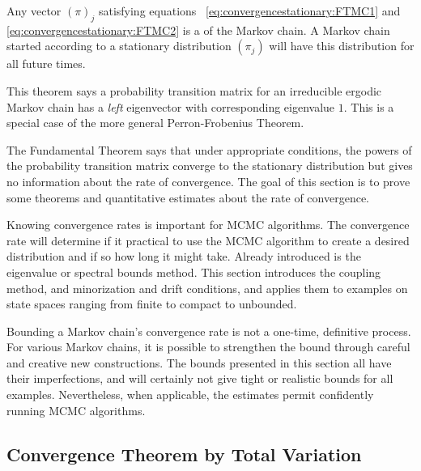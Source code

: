 \documentclass[12pt]{article}
\begin{document}
\begin{definition}
    Any vector \( (\pi)_{j} \) satisfying equations~%
    \eqref{eq:convergencestationary:FTMC1} and~%
    \eqref{eq:convergencestationary:FTMC2} is a %
    of the Markov chain.  A Markov chain started according to a
    stationary distribution \( (\pi_j) \) will have this distribution
    for all future times.
\end{definition}

\begin{remark}
    This theorem says a probability transition matrix for an irreducible
    ergodic Markov chain has a \emph{left} eigenvector with
    corresponding eigenvalue \( 1 \).  This is a special case of the
    more general Perron-Frobenius Theorem.
\end{remark}

\begin{remark}
    The Fundamental Theorem says that under appropriate conditions, the
    powers of the probability transition matrix converge to the
    stationary distribution but gives no information about the rate of
    convergence.  The goal of this section is to prove some theorems and
    quantitative estimates about the rate of convergence.
\end{remark}

Knowing convergence rates is important for MCMC algorithms.  The
convergence rate will determine if it practical to use the MCMC
algorithm to create a desired distribution and if so how long it might
take.  Already introduced is the eigenvalue or spectral bounds method.
This section introduces the coupling method, and minorization and drift
conditions, and applies them to examples on state spaces ranging from
finite to compact to unbounded.

Bounding a Markov chain's convergence rate is not a one-time, definitive
process.  For various Markov chains, it is possible to strengthen the
bound through careful and creative new constructions. The bounds
presented in this section all have their imperfections, and will
certainly not give tight or realistic bounds for all examples.
Nevertheless, when applicable, the estimates permit confidently running
MCMC algorithms.

\subsection*{Convergence Theorem by Total Variation}
\end{document}
